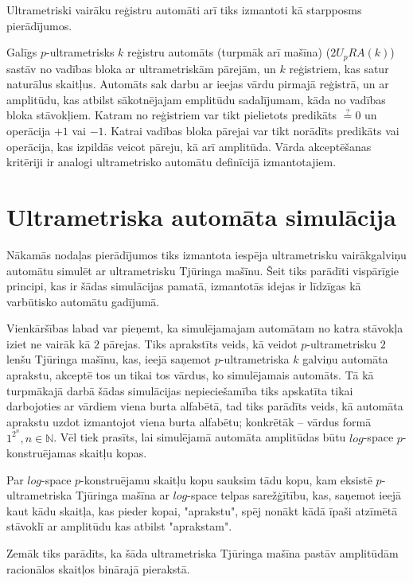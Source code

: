 \documentclass{ludis}
\begin{document}
Ultrametriski vairāku reģistru automāti arī tiks izmantoti kā starpposms pierādījumos.
\begin{definicija}
Galīgs $p$-ultrametrisks $k$ reģistru automāts (turpmāk arī mašīna) ($2U_pRA(k)$) sastāv no vadības bloka ar ultrametriskām pārejām, un $k$ reģistriem, kas satur naturālus skaitļus. Automāts sak darbu ar ieejas vārdu pirmajā reģistrā, un ar amplitūdu, kas atbilst sākotnējajam emplitūdu sadalījumam, kāda no vadības bloka stāvokļiem. Katram no reģistriem var tikt pielietots predikāts $\stackrel{?}{=} 0$ un operācija $+1$ vai $-1$. Katrai vadības bloka pārejai var tikt norādīts predikāts vai operācija, kas izpildās veicot pāreju, kā arī amplitūda. Vārda akceptēšanas kritēriji ir analogi ultrametrisko automātu definīcijā izmantotajiem.
\end{definicija}

\section{Ultrametriska automāta simulācija}
Nākamās nodaļas pierādījumos tiks izmantota iespēja ultrametrisku vairākgalviņu automātu simulēt ar ultrametrisku Tjūringa mašīnu. Šeit tiks parādīti vispārīgie principi, kas ir šādas simulācijas pamatā, izmantotās idejas ir līdzīgas kā ~\citep{Macarie1995} varbūtisko automātu gadījumā.

Vienkāršības labad var pieņemt, ka simulējamajam automātam no katra stāvokļa iziet ne vairāk kā $2$ pārejas. Tiks aprakstīts veids, kā veidot $p$-ultrametrisku $2$ lenšu Tjūringa mašīnu, kas, ieejā saņemot $p$-ultrametriska $k$ galviņu automāta aprakstu, akceptē tos un tikai tos vārdus, ko simulējamais automāts. Tā kā turpmākajā darbā šādas simulācijas nepieciešamība tiks apskatīta tikai darbojoties ar vārdiem viena burta alfabētā, tad tiks parādīts veids, kā automāta aprakstu uzdot izmantojot viena burta alfabētu; konkrētāk -- vārdus formā $1^{2^n}, n \in \mathbb{N}$. Vēl tiek prasīts, lai simulējamā automāta amplitūdas būtu $log$-space $p$-konstruējamas skaitļu kopas.

\begin{definicija}
Par $log$-space $p$-konstruējamu skaitļu kopu sauksim tādu kopu, kam eksistē $p$-ultrametriska Tjūringa mašīna ar $log$-space telpas sarežģītību, kas, saņemot ieejā kaut kādu skaitļa, kas pieder kopai, "aprakstu", spēj nonākt kādā īpaši atzīmētā stāvoklī ar amplitūdu kas atbilst "aprakstam".
\end{definicija}

Zemāk tiks parādīts, ka šāda ultrametriska Tjūringa mašīna pastāv amplitūdām racionālos skaitļos binārajā pierakstā.
\end{document}
